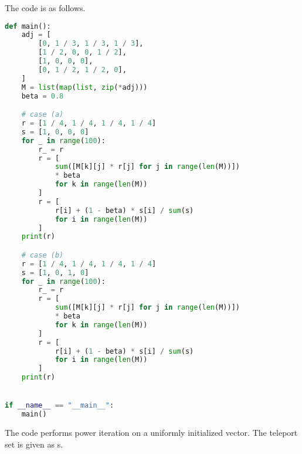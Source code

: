 \documentclass{article}
\begin{document}
\noindent
The code is as follows.
\begin{lstlisting}[language=Python]
def main():
    adj = [
        [0, 1 / 3, 1 / 3, 1 / 3],
        [1 / 2, 0, 0, 1 / 2],
        [1, 0, 0, 0],
        [0, 1 / 2, 1 / 2, 0],
    ]
    M = list(map(list, zip(*adj)))
    beta = 0.8

    # case (a)
    r = [1 / 4, 1 / 4, 1 / 4, 1 / 4]
    s = [1, 0, 0, 0]
    for _ in range(100):
        r_ = r
        r = [
            sum([M[k][j] * r[j] for j in range(len(M))])
            * beta
            for k in range(len(M))
        ]
        r = [
            r[i] + (1 - beta) * s[i] / sum(s)
            for i in range(len(M))
        ]
    print(r)

    # case (b)
    r = [1 / 4, 1 / 4, 1 / 4, 1 / 4]
    s = [1, 0, 1, 0]
    for _ in range(100):
        r_ = r
        r = [
            sum([M[k][j] * r[j] for j in range(len(M))])
            * beta
            for k in range(len(M))
        ]
        r = [
            r[i] + (1 - beta) * s[i] / sum(s)
            for i in range(len(M))
        ]
    print(r)


if __name__ == "__main__":
    main()
\end{lstlisting}

\noindent
The code performs power iteration on a uniformly initialized vector. The teleport set is given as s.
\end{document}
